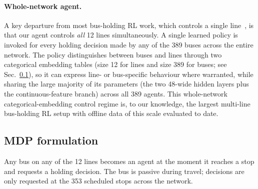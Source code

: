 \documentclass[journal,10pt]{IEEEtran}
\begin{document}
\paragraph{Whole-network agent.} A key departure from most bus-holding RL work, which controls a single line~\cite{wang2020holding}, is that our agent controls \emph{all} 12 lines simultaneously. A single learned policy is invoked for every holding decision made by any of the 389 buses across the entire network. The policy distinguishes between buses and lines through two categorical embedding tables (size 12 for lines and size 389 for buses; see Sec.~\ref{sec:mdp}), so it can express line- or bus-specific behaviour where warranted, while sharing the large majority of its parameters (the two 48-wide hidden layers plus the continuous-feature branch) across all 389 agents. This whole-network categorical-embedding control regime is, to our knowledge, the largest multi-line bus-holding RL setup with offline data of this scale evaluated to date.

\subsection{MDP formulation}
\label{sec:mdp}

Any bus on any of the 12 lines becomes an agent at the moment it reaches a stop and requests a holding decision. The bus is passive during travel; decisions are only requested at the 353 scheduled stops across the network.
\end{document}
